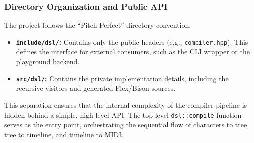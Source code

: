 \subsubsection{Directory Organization and Public API}

The project follows the ``Pitch-Perfect'' directory convention:
\begin{itemize}
  \item \textbf{\texttt{include/dsl/}:} Contains only the public headers (e.g., \texttt{compiler.hpp}).
    This defines the interface for external consumers, such as the CLI wrapper or the playground backend.
  \item \textbf{\texttt{src/dsl/}:} Contains the private implementation details, including the recursive visitors and
    generated Flex/Bison sources.
\end{itemize}
This separation ensures that the internal complexity of the compiler pipeline is hidden behind a simple, high-level
API\@.
The top-level \texttt{dsl::compile} function serves as the entry point, orchestrating the sequential flow of characters
to tree, tree to timeline, and timeline to MIDI\@.
